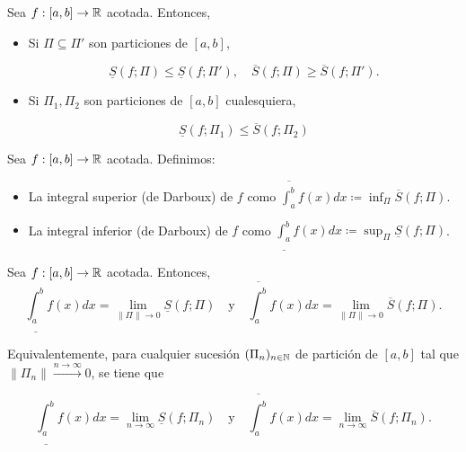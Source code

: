 	\begin{prop}
		Sea $f:[a,b]\to\mathbb{R}$ acotada. Entonces,
		\begin{itemize}
			\item Si $\Pi\subseteq\Pi'$ son particiones de $[a,b]$,

			\[
			\underline{S}(f;\Pi)\leq\underline{S}(f;\Pi'),\quad\overline{S}(f;\Pi)\geq\overline{S}(f;\Pi').
			\]

			\item Si $\Pi_1,\Pi_2$ son particiones de $[a,b]$ cualesquiera,

			\[
			\underline{S}(f;\Pi_1)\leq\overline{S}(f;\Pi_2)
			\]
		\end{itemize}
	\end{prop}

	\begin{definition}
		Sea $f:[a,b]\to\mathbb{R}$ acotada. Definimos:
		\begin{itemize}
			\item La integral superior (de Darboux) de $f$ como $\overline{\int_{a}^{b}} f(x) dx \coloneq \displaystyle{\inf_{\Pi}} \overline{S}(f;\Pi)$.
			
			\item La integral inferior (de Darboux) de $f$ como $\underline{\int_{a}^{b}} f(x) dx \coloneq \displaystyle{\sup_{\Pi}} \underline{S}(f;\Pi)$.
		\end{itemize}
	\end{definition}

	\begin{theorem}
		Sea $f:[a,b]\to\mathbb{R}$ acotada. Entonces,
		\[
		\underline{\int_{a}^{b}} f(x) dx = \displaystyle{\lim_{\|\Pi\|\to 0}} \underline{S}(f;\Pi)\quad \text{y} \quad \overline{\int_{a}^{b}} f(x) dx = \displaystyle{\lim_{\|\Pi\|\to 0}}\overline{S}(f;\Pi).
		\]
	\end{theorem}

	\begin{remark}
		Equivalentemente, para cualquier sucesión $(\Pi_n)_{n\in\mathbb{N}}$ de partición de $[a,b]$ tal que $\|\Pi_n\|\xrightarrow{n\to\infty} 0$, se tiene que 

		\[
		\underline{\int_{a}^{b}} f(x) dx = \lim_{n\to\infty} \underline{S}(f;\Pi_n)\quad\text{y}\quad \overline{\int_{a}^{b}} f(x) dx = \lim_{n\to \infty} \overline{S}(f;\Pi_n).
		\]
	\end{remark}

